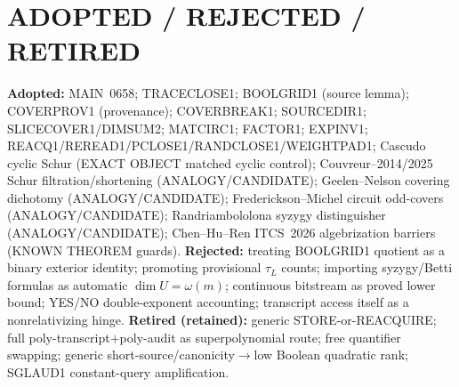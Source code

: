 \documentclass[11pt]{article}
\begin{document}
\section*{ADOPTED / REJECTED / RETIRED}
\textbf{Adopted:} MAIN~0658; TRACECLOSE1; BOOLGRID1 (source lemma); COVERPROV1 (provenance);
COVERBREAK1; SOURCEDIR1; SLICECOVER1/DIMSUM2; MATCIRC1; FACTOR1; EXPINV1;
REACQ1/REREAD1/PCLOSE1/RANDCLOSE1/WEIGHTPAD1; Cascudo cyclic Schur (EXACT OBJECT matched
cyclic control); Couvreur--2014/2025 Schur filtration/shortening (ANALOGY/CANDIDATE);
Geelen--Nelson covering dichotomy (ANALOGY/CANDIDATE); Frederickson--Michel circuit
odd-covers (ANALOGY/CANDIDATE); Randriambololona syzygy distinguisher (ANALOGY/CANDIDATE);
Chen--Hu--Ren ITCS~2026 algebrization barriers (KNOWN THEOREM guards).
\textbf{Rejected:} treating BOOLGRID1 quotient as a binary exterior identity; promoting
provisional $\tau_L$ counts; importing syzygy/Betti formulas as automatic
$\dim U=\omega(m)$; continuous bitstream as proved lower bound; YES/NO double-exponent
accounting; transcript access itself as a nonrelativizing hinge.
\textbf{Retired (retained):} generic STORE-or-REACQUIRE; full poly-transcript$+$poly-audit
as superpolynomial route; free quantifier swapping; generic short-source/canonicity$\to$low
Boolean quadratic rank; SGLAUD1 constant-query amplification.
\end{document}

